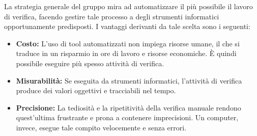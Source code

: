 La strategia generale del gruppo \gruppo \space mira ad automatizzare il più possibile il lavoro di verifica, facendo gestire tale processo a degli strumenti informatici opportunamente predisposti. \newline
I vantaggi derivanti da tale scelta sono i seguenti:
\begin{itemize}
    \item \textbf{Costo:} L'uso di {tool} automatizzati non impiega {risorse} umane, il che si traduce in un risparmio in ore di lavoro e risorse economiche. È quindi possibile eseguire più spesso attività di verifica.
    \item \textbf{Misurabilità:} Se eseguita da strumenti informatici, l'attività di verifica produce dei valori oggettivi e tracciabili nel tempo.
    \item \textbf{Precisione:} La tediosità e la ripetitività della verifica manuale rendono quest'ultima frustrante e prona a contenere imprecisioni. Un computer, invece, esegue tale compito velocemente e senza errori.
\end{itemize}